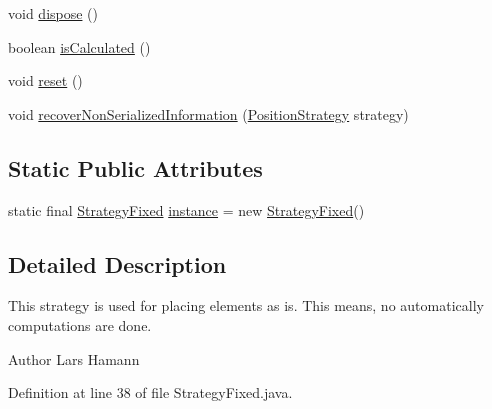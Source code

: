 \begin{DoxyCompactItemize}
void \hyperlink{classorg_1_1tzi_1_1use_1_1gui_1_1views_1_1diagrams_1_1elements_1_1positioning_1_1_strategy_fixed_af6cfc51104cbd337fec558173edc3d66}{dispose} ()
\item 
boolean \hyperlink{classorg_1_1tzi_1_1use_1_1gui_1_1views_1_1diagrams_1_1elements_1_1positioning_1_1_strategy_fixed_a5c652ab9c4fc2d81389d2b011d4c8b18}{is\-Calculated} ()
\item 
void \hyperlink{classorg_1_1tzi_1_1use_1_1gui_1_1views_1_1diagrams_1_1elements_1_1positioning_1_1_strategy_fixed_a328eefcc961765ad50066ade0b78ee76}{reset} ()
\item 
void \hyperlink{classorg_1_1tzi_1_1use_1_1gui_1_1views_1_1diagrams_1_1elements_1_1positioning_1_1_strategy_fixed_afb27777187bd5a0363427c1d3ab6860e}{recover\-Non\-Serialized\-Information} (\hyperlink{interfaceorg_1_1tzi_1_1use_1_1gui_1_1views_1_1diagrams_1_1elements_1_1positioning_1_1_position_strategy}{Position\-Strategy} strategy)
\end{DoxyCompactItemize}
\subsection*{Static Public Attributes}
\begin{DoxyCompactItemize}
\item 
static final \hyperlink{classorg_1_1tzi_1_1use_1_1gui_1_1views_1_1diagrams_1_1elements_1_1positioning_1_1_strategy_fixed}{Strategy\-Fixed} \hyperlink{classorg_1_1tzi_1_1use_1_1gui_1_1views_1_1diagrams_1_1elements_1_1positioning_1_1_strategy_fixed_a973a1566cc43e33e560f48fab1a9cf42}{instance} = new \hyperlink{classorg_1_1tzi_1_1use_1_1gui_1_1views_1_1diagrams_1_1elements_1_1positioning_1_1_strategy_fixed}{Strategy\-Fixed}()
\end{DoxyCompactItemize}


\subsection{Detailed Description}
This strategy is used for placing elements as is. This means, no automatically computations are done.

\begin{DoxyAuthor}{Author}
Lars Hamann 
\end{DoxyAuthor}


Definition at line 38 of file Strategy\-Fixed.\-java.



